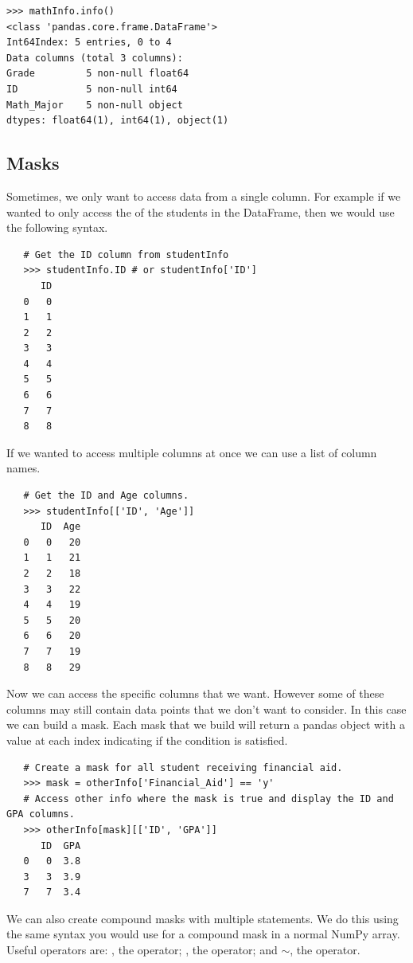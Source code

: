 \begin{lstlisting}
>>> mathInfo.info()
<class 'pandas.core.frame.DataFrame'>
Int64Index: 5 entries, 0 to 4
Data columns (total 3 columns):
Grade         5 non-null float64
ID            5 non-null int64
Math_Major    5 non-null object
dtypes: float64(1), int64(1), object(1)
\end{lstlisting}

\subsection*{Masks}
Sometimes, we only want to access data from a single column.
For example if we wanted to only access the  of the students in the  DataFrame, then we would use the following syntax.
\begin{lstlisting}
   # Get the ID column from studentInfo
   >>> studentInfo.ID # or studentInfo['ID']
      ID
   0   0
   1   1
   2   2
   3   3
   4   4
   5   5
   6   6
   7   7
   8   8
\end{lstlisting}
If we wanted to access multiple columns at once we can use a list of column names.
\begin{lstlisting}
   # Get the ID and Age columns.
   >>> studentInfo[['ID', 'Age']]
      ID  Age
   0   0   20
   1   1   21
   2   2   18
   3   3   22
   4   4   19
   5   5   20
   6   6   20
   7   7   19
   8   8   29
\end{lstlisting}

Now we can access the specific columns that we want.
However some of these columns may still contain data points that we don't want to consider.
In this case we can build a mask.
Each mask that we build will return a pandas  object with a  value at each index indicating if the condition is satisfied.

\begin{lstlisting}
   # Create a mask for all student receiving financial aid.
   >>> mask = otherInfo['Financial_Aid'] == 'y'
   # Access other info where the mask is true and display the ID and GPA columns.
   >>> otherInfo[mask][['ID', 'GPA']]
      ID  GPA
   0   0  3.8
   3   3  3.9
   7   7  3.4
\end{lstlisting}

We can also create compound masks with multiple statements.
We do this using the same syntax you would use for a compound mask in a normal NumPy array.
Useful operators are: \li{&}, the  operator; \li{|}, the  operator; and $\sim$, the  operator.

